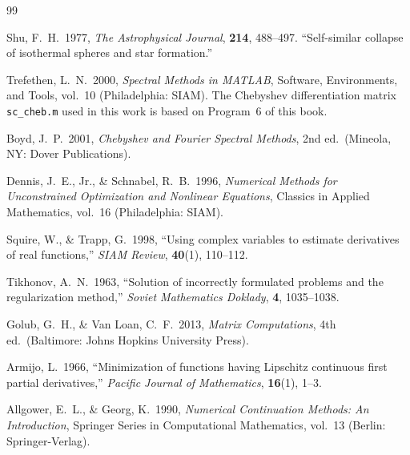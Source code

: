 \documentclass[11pt,a4paper]{article}
\begin{document}
\begin{thebibliography}{99}

Shu, F.~H.\ 1977, \emph{The Astrophysical Journal}, \textbf{214},
488--497.
``Self-similar collapse of isothermal spheres and star formation.''

Trefethen, L.~N.\ 2000, \emph{Spectral Methods in MATLAB},
Software, Environments, and Tools, vol.~10 (Philadelphia: SIAM).
The Chebyshev differentiation matrix \texttt{sc\_cheb.m} used in this
work is based on Program~6 of this book.

Boyd, J.~P.\ 2001, \emph{Chebyshev and Fourier Spectral Methods},
2nd ed.\ (Mineola, NY: Dover Publications).


Dennis, J.~E., Jr., \& Schnabel, R.~B.\ 1996,
\emph{Numerical Methods for Unconstrained Optimization and Nonlinear
Equations}, Classics in Applied Mathematics, vol.~16
(Philadelphia: SIAM).

Squire, W., \& Trapp, G.\ 1998,
``Using complex variables to estimate derivatives of real functions,''
\emph{SIAM Review}, \textbf{40}(1), 110--112.

Tikhonov, A.~N.\ 1963,
``Solution of incorrectly formulated problems and the regularization
method,''
\emph{Soviet Mathematics Doklady}, \textbf{4}, 1035--1038.

Golub, G.~H., \& Van Loan, C.~F.\ 2013,
\emph{Matrix Computations}, 4th ed.\
(Baltimore: Johns Hopkins University Press).

Armijo, L.\ 1966,
``Minimization of functions having Lipschitz continuous first partial
derivatives,''
\emph{Pacific Journal of Mathematics}, \textbf{16}(1), 1--3.

Allgower, E.~L., \& Georg, K.\ 1990,
\emph{Numerical Continuation Methods: An Introduction},
Springer Series in Computational Mathematics, vol.~13
(Berlin: Springer-Verlag).


\end{thebibliography}
\end{document}
